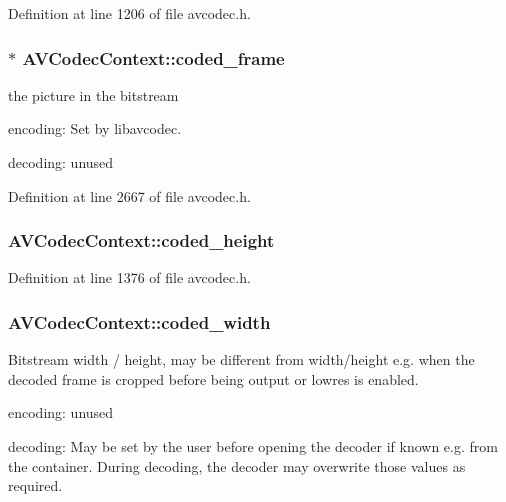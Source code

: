 Definition at line 1206 of file avcodec.\+h.

\subsubsection[{\texorpdfstring{coded\+\_\+frame}{coded_frame}}]{$\ast$ A\+V\+Codec\+Context\+::coded\+\_\+frame}\hypertarget{struct_a_v_codec_context_afdebc347b4f74e0b9271ff37cabc96e8}{}\label{struct_a_v_codec_context_afdebc347b4f74e0b9271ff37cabc96e8}
the picture in the bitstream
\begin{DoxyItemize}
\item encoding\+: Set by libavcodec.
\item decoding\+: unused 
\end{DoxyItemize}

Definition at line 2667 of file avcodec.\+h.

\subsubsection[{\texorpdfstring{coded\+\_\+height}{coded_height}}]{ A\+V\+Codec\+Context\+::coded\+\_\+height}\hypertarget{struct_a_v_codec_context_ab2ebb76836ef4cd9822b5077c17b33d0}{}\label{struct_a_v_codec_context_ab2ebb76836ef4cd9822b5077c17b33d0}


Definition at line 1376 of file avcodec.\+h.

\subsubsection[{\texorpdfstring{coded\+\_\+width}{coded_width}}]{ A\+V\+Codec\+Context\+::coded\+\_\+width}\hypertarget{struct_a_v_codec_context_ae3c157e97ff15d46e898a538c6bc7f09}{}\label{struct_a_v_codec_context_ae3c157e97ff15d46e898a538c6bc7f09}
Bitstream width / height, may be different from width/height e.\+g. when the decoded frame is cropped before being output or lowres is enabled.
\begin{DoxyItemize}
\item encoding\+: unused
\item decoding\+: May be set by the user before opening the decoder if known e.\+g. from the container. During decoding, the decoder may overwrite those values as required. 
\end{DoxyItemize}


